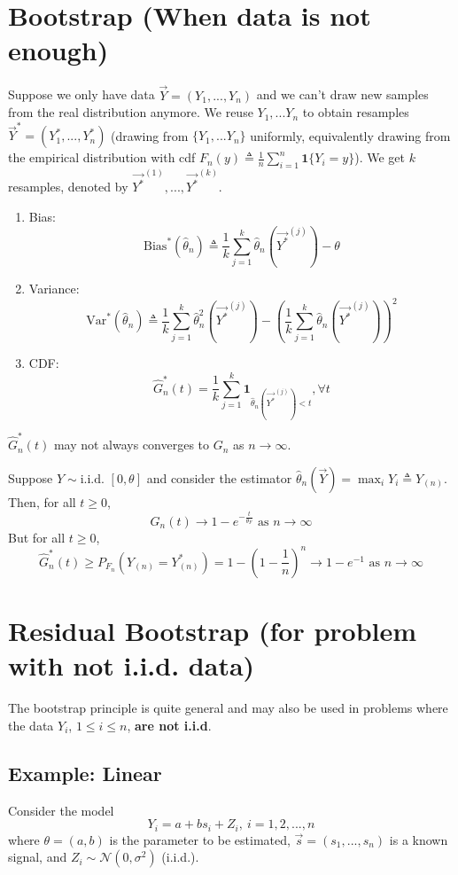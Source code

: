 \documentclass[11pt]{elegantbook}
\begin{document}
\section{Bootstrap (When data is not enough)}
Suppose we only have data $\vec{Y}=(Y_1,...,Y_n)$ and we can't draw new samples from the real distribution anymore. We reuse $Y_1,...Y_n$ to obtain resamples $\vec{Y}^*=(Y_1^*,...,Y_n^*)$ (drawing from $\{Y_1,...Y_n\}$ uniformly, equivalently drawing from the empirical distribution with cdf $F_n(y)\triangleq \frac{1}{n}\sum_{i=1}^n\mathbf{1}\{Y_i=y\}$). We get $k$ resamples, denoted by ${\vec{Y^*}}^{(1)},...,{\vec{Y^*}}^{(k)}$.
\begin{enumerate}
    \item Bias: $$\text{Bias}^*(\hat{\theta}_n)\triangleq\frac{1}{k}\sum_{j=1}^k \hat{\theta}_n(\vec{Y^*}^{(j)})-\theta$$
    \item Variance: $$\text{Var}^*(\hat{\theta}_n)\triangleq\frac{1}{k}\sum_{j=1}^k \hat{\theta}^2_n(\vec{Y^*}^{(j)})-\left(\frac{1}{k}\sum_{j=1}^k \hat{\theta}_n(\vec{Y^*}^{(j)})\right)^2$$
    \item CDF: $$\hat{G}^*_{n}(t)=\frac{1}{k}\sum_{j=1}^k \mathbf{1}_{\hat{\theta}_n(\vec{Y^*}^{(j)})<t},\forall t$$
\end{enumerate}
\begin{note}
    $\hat{G}^*_{n}(t)$ may not always converges to $G_n$ as $n \rightarrow \infty$.
\end{note}
\begin{example}
    Suppose $Y\sim \text{i.i.d. }[0,\theta]$ and consider the estimator $\hat{\theta}_n(\vec{Y})=\max_i Y_i\triangleq Y_{(n)}$. Then, for all $t\geq 0$, $$G_n(t) \rightarrow 1-e^{-\frac{t}{\theta_F}}\text{ as }n \rightarrow \infty$$
    But for all $t\geq 0$, $$\hat{G}^*_{n}(t)\geq P_{F_n}(Y_{(n)}=Y^*_{(n)})=1-(1-\frac{1}{n})^n \rightarrow  1-e^{-1} \text{ as }n \rightarrow \infty$$
\end{example}


\section{Residual Bootstrap (for problem with not i.i.d. data)}
The bootstrap principle is quite general and may also be used in problems where the data $Y_i$, $1\leq i\leq n$, \textbf{are not i.i.d}.

\subsection{Example: Linear}
Consider the model $$Y_i=a+bs_i+Z_i,\ i=1,2,...,n$$
where $\theta=(a,b)$ is the parameter to be estimated, $\vec{s}=(s_1,...,s_n)$ is a known signal, and $Z_i\sim \mathcal{N}(0,\sigma^2)$ (i.i.d.).
\end{document}
